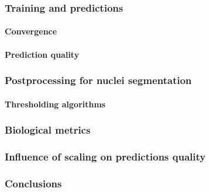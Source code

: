     \subsubsection{Training and predictions}
        \paragraph{Convergence}
              
        \paragraph{Prediction quality}
            \label{section:nuclei-predictions}
              
    \subsubsection{Postprocessing for nuclei segmentation}
        
        \paragraph{Thresholding algorithms}
        
    \subsubsection{Biological metrics}
        
    \subsubsection{Influence of scaling on predictions quality}
        
    \subsubsection{Conclusions}
        
